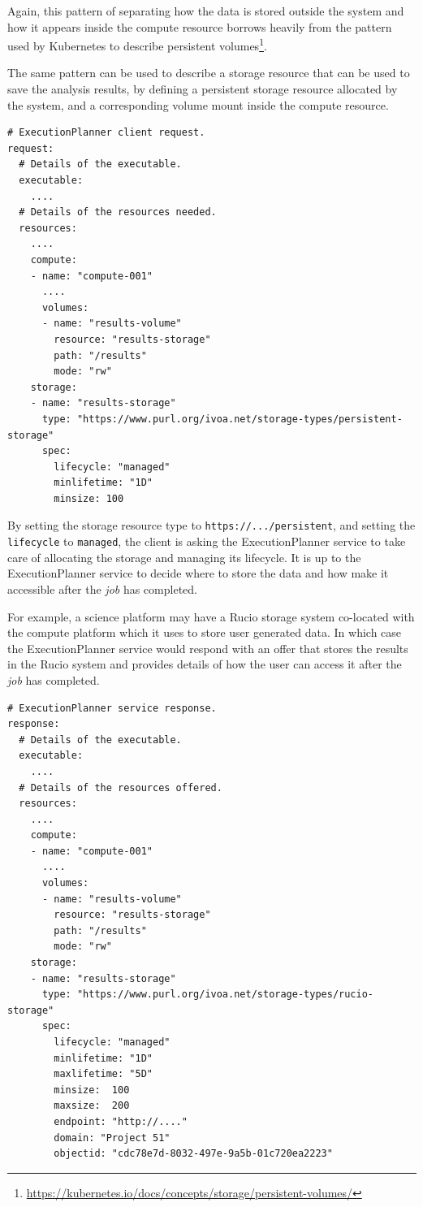 \documentclass[11pt,a4paper]{ivoa}
\newcommand{\execplanner} {ExecutionPlanner}
\newcommand{\rucio} {Rucio}
\newcommand{\kubernetes} {Kubernetes}
\newcommand{\codeword}[1] {\texttt{#1}}
\newcommand{\footurl}[1] {\footnote{\url{#1}}}
\newcommand{\job} {\textit{job}}
\begin{document}
Again, this pattern of separating how the data is stored outside the system
and how it appears inside the compute resource borrows heavily from the
pattern used by \kubernetes{} to describe persistent
volumes\footurl{https://kubernetes.io/docs/concepts/storage/persistent-volumes/}.

The same pattern can be used to describe a storage resource that can be used
to save the analysis results, by defining a persistent storage resource
allocated by the system, and a corresponding volume mount inside the compute resource.

\begin{lstlisting}[]
# ExecutionPlanner client request.
request:
  # Details of the executable.
  executable:
    ....
  # Details of the resources needed.
  resources:
    ....
    compute:
    - name: "compute-001"
      ....
      volumes:
      - name: "results-volume"
        resource: "results-storage"
        path: "/results"
        mode: "rw"
    storage:
    - name: "results-storage"
      type: "https://www.purl.org/ivoa.net/storage-types/persistent-storage"
      spec:
        lifecycle: "managed"
        minlifetime: "1D"
        minsize: 100
\end{lstlisting}

By setting the storage resource type to \codeword{https://.../persistent},
and setting the \codeword{lifecycle} to \codeword{managed},
the client is asking the \execplanner{} service to take care of allocating
the storage and managing its lifecycle.
It is up to the \execplanner{} service to decide where to store the data and
how make it accessible after the \job{} has completed.

For example, a science platform may have a \rucio{} storage system co-located
with the compute platform which it uses to store user generated data.
In which case the \execplanner{} service would respond with an offer that
stores the results in the \rucio{} system and provides details of how the user
can access it after the \job{} has completed.

\begin{lstlisting}[]
# ExecutionPlanner service response.
response:
  # Details of the executable.
  executable:
    ....
  # Details of the resources offered.
  resources:
    ....
    compute:
    - name: "compute-001"
      ....
      volumes:
      - name: "results-volume"
        resource: "results-storage"
        path: "/results"
        mode: "rw"
    storage:
    - name: "results-storage"
      type: "https://www.purl.org/ivoa.net/storage-types/rucio-storage"
      spec:
        lifecycle: "managed"
        minlifetime: "1D"
        maxlifetime: "5D"
        minsize:  100
        maxsize:  200
        endpoint: "http://...."
        domain: "Project 51"
        objectid: "cdc78e7d-8032-497e-9a5b-01c720ea2223"
\end{lstlisting}
\end{document}
